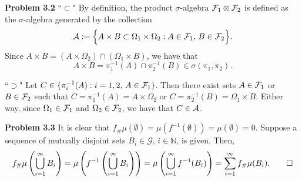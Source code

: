 \textbf{Problem 3.2}
``$\subset$" By definition, the product $\sigma$-algebra $\mathcal F_1\otimes\mathcal F_2$ is defined as the $\sigma$-algebra generated by the collection
\[
	\mathcal A := \Bigl\{ A\times B\subset \Omega_1\times\Omega_2 : A\in\mathcal F_1,\, B\in\mathcal F_2\Bigr\}.
\]
Since $A\times B = (A\times\Omega_2) \cap (\Omega_1\times B)$, we have that
\[
	A\times B = \pi_1^{-1}(A)\cap\pi_2^{-1}(B) \in \sigma(\pi_1,\pi_2).
\]

``$\supset$" Let $C\in \{ \pi_i^{-1}(A) : i=1,2,\, A\in\mathcal F_1\}$. Then there exist sets $A\in \mathcal F_1$ or $B\in \mathcal F_2$ such that $C = \pi_1^{-1}(A) = A\times\Omega_2$ or $C= \pi_2^{-1}(B) = \Omega_1\times B$. Either way, since $\Omega_1\in\mathcal F_1$ and $\Omega_2\in\mathcal F_2$, we have that $C\in\mathcal A$.

\bigskip


\textbf{Problem 3.3}
It is clear that $f_{\#}\mu(\emptyset) = \mu(f^{-1}(\emptyset)) = \mu(\emptyset) = 0$. 
	Suppose a sequence of mutually disjoint sets $B_i \in \mathcal{G}$, $i \in \mathbb{N}$, is given. Then,
	\[
	f_{\#} \mu\left( \bigcup_{i=1}^\infty B_i \right) = \mu\left( f^{-1} \left(\bigcup_{i=1}^\infty B_i \right) \right) = \mu \left( \bigcup_{i=1}^\infty  f^{-1}(B_i) \right) = \sum_{i=1}^\infty f_{\#}\mu (B_i). \qedhere
	\]
	
\bigskip


